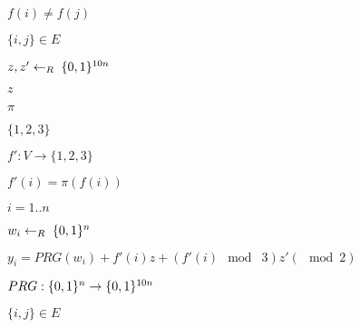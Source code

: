 \documentclass[10pt]{book}
\begin{document}
\begin{mdSnippets}
\begin{mdInlineSnippet}[63165353c3630910bffe05a2d1f9bf4f]
$f(i)\neq f(j)$\end{mdInlineSnippet}%
\begin{mdInlineSnippet}[321e8be9a994456a2d7febe17e8f51d5]%
$\{i,j\}\in E$\end{mdInlineSnippet}%
\begin{mdInlineSnippet}[33f5a13b88c01d73e5f4c05cab1cb107]%
$z,z' \leftarrow_R\; \{0,1\}^{10n}$\end{mdInlineSnippet}%
\begin{mdInlineSnippet}[fbade9e36a3f36d3d676c1b808451dd7]%
$z$\end{mdInlineSnippet}%
\begin{mdInlineSnippet}%
$\pi$\end{mdInlineSnippet}%
\begin{mdInlineSnippet}[1d4734bc6db8002e08e28eec76ab0b7a]%
$\{1,2,3\}$\end{mdInlineSnippet}%
\begin{mdInlineSnippet}[43d7df4cd2653a5c8860e0e5a038ba00]%
$f':V\rightarrow \{1,2,3\}$\end{mdInlineSnippet}%
\begin{mdInlineSnippet}%
$f'(i)=\pi(f(i))$\end{mdInlineSnippet}%
\begin{mdInlineSnippet}[9284220ad3b340f2b5cc5c20d995c906]%
$i=1..n$\end{mdInlineSnippet}%
\begin{mdInlineSnippet}%
$w_i \leftarrow_R\; \{0,1\}^n$\end{mdInlineSnippet}%
\begin{mdInlineSnippet}[a3b48626cd7d9e0ddcecc07882e86e83]%
$y_i = PRG(w_i)+f'(i)z +(f'(i) \mod\; 3)z' (\mod 2)$\end{mdInlineSnippet}%
\begin{mdInlineSnippet}%
$PRG:\{0,1\}^n\rightarrow\{0,1\}^{10n}$\end{mdInlineSnippet}%
\begin{mdInlineSnippet}%
$\{i,j \} \in E$\end{mdInlineSnippet}%
\begin{mdInlineSnippet}[865c0c0b4ab0e063e5caa3387c1a8741]%

\end{mdInlineSnippet}
\end{mdSnippets}
\end{document}
